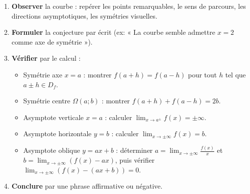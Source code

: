 \documentclass[11pt]{article}
\begin{document}
\begin{methode}
\begin{enumerate}
\item \textbf{Observer} la courbe : repérer les points remarquables, le sens de parcours, les directions asymptotiques, les symétries visuelles.
\item \textbf{Formuler} la conjecture par écrit (ex: « La courbe semble admettre $x=2$ comme axe de symétrie »).
\item \textbf{Vérifier} par le calcul :
\begin{itemize}
\item Symétrie axe $x=a$ : montrer $f(a+h)=f(a-h)$ pour tout $h$ tel que $a\pm h\in D_f$.
\item Symétrie centre $\Omega(a;b)$ : montrer $f(a+h)+f(a-h)=2b$.
\item Asymptote verticale $x=a$ : calculer $\lim_{x\to a^{\pm}}f(x)=\pm\infty$.
\item Asymptote horizontale $y=b$ : calculer $\lim_{x\to\pm\infty}f(x)=b$.
\item Asymptote oblique $y=ax+b$ : déterminer $a=\lim_{x\to\pm\infty}\frac{f(x)}{x}$ et $b=\lim_{x\to\pm\infty}(f(x)-ax)$, puis vérifier $\lim_{x\to\pm\infty}(f(x)-(ax+b))=0$.
\end{itemize}
\item \textbf{Conclure} par une phrase affirmative ou négative.
\end{enumerate}
\end{methode}
\end{document}
